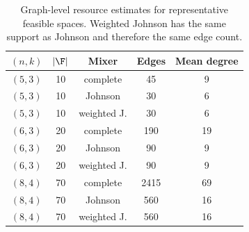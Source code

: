 \begin{table}[t]
\centering
\caption{Graph-level resource estimates for representative feasible spaces. Weighted Johnson has the same support as Johnson and therefore the same edge count.}
\label{tab:graph-resources}
\begin{tabular}{ccccc}
\toprule
$(n,k)$ & $|\F|$ & Mixer & Edges & Mean degree\\
\midrule
$(5,3)$ & 10 & complete & 45 & 9\\
$(5,3)$ & 10 & Johnson & 30 & 6\\
$(5,3)$ & 10 & weighted J. & 30 & 6\\
$(6,3)$ & 20 & complete & 190 & 19\\
$(6,3)$ & 20 & Johnson & 90 & 9\\
$(6,3)$ & 20 & weighted J. & 90 & 9\\
$(8,4)$ & 70 & complete & 2415 & 69\\
$(8,4)$ & 70 & Johnson & 560 & 16\\
$(8,4)$ & 70 & weighted J. & 560 & 16\\
\bottomrule
\end{tabular}
\end{table}
